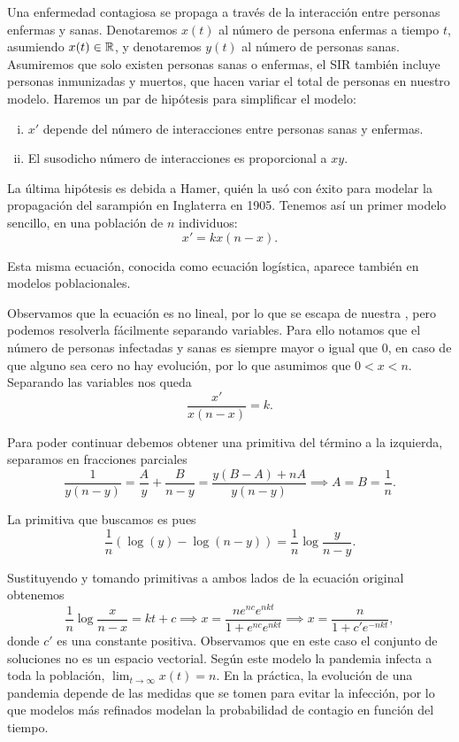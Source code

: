 \documentclass[../ecuaciones_diferenciales.tex]{subfiles}
\begin{document}
Una enfermedad contagiosa se propaga a través de la interacción entre personas
enfermas y sanas. Denotaremos \(x(t)\) al número de persona enfermas a tiempo
\(t\), asumiendo \(x(t) \in \mathbb{R}\), y denotaremos \(y(t)\) al número de personas
sanas. Asumiremos que solo existen personas sanas o enfermas, el SIR también
incluye personas inmunizadas y muertos, que hacen variar el total de personas en
nuestro modelo. Haremos un par de hipótesis para simplificar el modelo:
\begin{enumerate}[i)]
	\item \(x'\) depende del número de interacciones entre personas sanas y
	      enfermas.

	\item El susodicho número de interacciones es proporcional a \(xy\).
\end{enumerate}

La última hipótesis es debida a Hamer, quién la usó con éxito para modelar
la propagación del sarampión en Inglaterra en 1905. Tenemos así un primer
modelo sencillo, en una población de \(n\) individuos:
\[x' = k x(n - x).\]

\begin{remark}
	Esta misma ecuación, conocida como ecuación logística, aparece también en
	modelos poblacionales.
\end{remark}

Observamos que la ecuación es no lineal, por lo que se escapa de nuestra
, pero podemos resolverla fácilmente separando
variables. Para ello notamos que el número de personas infectadas y sanas es
siempre mayor o igual que 0, en caso de que alguno sea cero no hay evolución,
por lo que asumimos que \(0 < x < n\).  Separando las variables nos queda
\[\frac{x'}{x(n - x)} = k.\]

Para poder continuar debemos obtener una primitiva del término a la izquierda,
separamos en fracciones parciales
\[\frac{1}{y(n - y)} = \frac{A}{y} + \frac{B}{n - y}
	= \frac{y(B - A) + nA}{y(n - y)} \implies A = B = \frac{1}{n}.\]

La primitiva que buscamos es pues
\[\frac{1}{n} (\log(y) - \log(n - y)) = \frac{1}{n} \log \frac{y}{n - y}.\]

Sustituyendo y tomando primitivas a ambos lados de la ecuación original obtenemos
\[\frac{1}{n} \log\frac{x}{n - x} = kt + c
	\implies x = \frac{n e^{nc} e^{nkt}}{1 + e^{nc} e^{nkt}}
	\implies x = \frac{n}{1 + c' e^{-nkt}},\]
donde \(c'\) es una constante positiva. Observamos que en este caso el
conjunto de soluciones no es un espacio vectorial. Según este modelo la
pandemia infecta a toda la población, \(\lim_{t \to \infty} x(t) = n\). En la
práctica, la evolución de una pandemia depende de las medidas que se tomen
para evitar la infección, por lo que modelos más refinados modelan la
probabilidad de contagio en función del tiempo.
\end{document}
